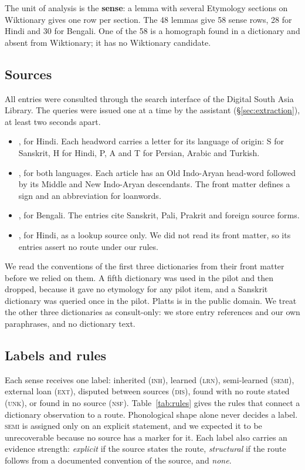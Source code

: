 \documentclass[11pt]{article}
\newcommand{\lbl}[1]{\textsc{#1}}
\begin{document}
The unit of analysis is the \textbf{sense}: a lemma with several Etymology sections on Wiktionary gives one row per section. The 48 lemmas give 58 sense rows, 28 for Hindi and 30 for Bengali. One of the 58 is a homograph found in a dictionary and absent from Wiktionary; it has no Wiktionary candidate.

\subsection{Sources}

All entries were consulted through the search interface of the Digital South Asia Library. The queries were issued one at a time by the assistant (\S\ref{sec:extraction}), at least two seconds apart.
\begin{itemize}
\item \textbf{\citet{platts1884}}, for Hindi. Each headword carries a letter for its language of origin: S for Sanskrit, H for Hindi, P, A and T for Persian, Arabic and Turkish.
\item \textbf{\citet{turner1966cdial}}, for both languages. Each article has an Old Indo-Aryan head-word followed by its Middle and New Indo-Aryan descendants. The front matter defines a sign and an abbreviation for loanwords.
\item \textbf{\citet{dasa1937bangala}}, for Bengali. The entries cite Sanskrit, Pali, Prakrit and foreign source forms.
\item \textbf{\citet{dasa1975sabdasagara}}, for Hindi, as a lookup source only. We did not read its front matter, so its entries assert no route under our rules.
\end{itemize}
We read the conventions of the first three dictionaries from their front matter before we relied on them. A fifth dictionary was used in the pilot and then dropped, because it gave no etymology for any pilot item, and a Sanskrit dictionary was queried once in the pilot. Platts is in the public domain. We treat the other three dictionaries as consult-only: we store entry references and our own paraphrases, and no dictionary text.

\subsection{Labels and rules}

Each sense receives one label: inherited (\lbl{inh}), learned (\lbl{lrn}), semi-learned (\lbl{semi}), external loan (\lbl{ext}), disputed between sources (\lbl{dis}), found with no route stated (\lbl{unk}), or found in no source (\lbl{nsf}). Table~\ref{tab:rules} gives the rules that connect a dictionary observation to a route. Phonological shape alone never decides a label. \lbl{semi} is assigned only on an explicit statement, and we expected it to be unrecoverable because no source has a marker for it. Each label also carries an evidence strength: \textit{explicit} if the source states the route, \textit{structural} if the route follows from a documented convention of the source, and \textit{none}.
\end{document}
